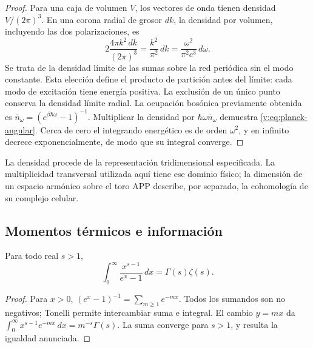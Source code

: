 \begin{proof}
Para una caja de volumen \(V\), los vectores de onda tienen densidad
\(V/(2\pi)^3\). En una corona radial de grosor \(dk\), la densidad
por volumen, incluyendo las dos polarizaciones, es
\[
 2\frac{4\pi k^2\,dk}{(2\pi)^3}=\frac{k^2}{\pi^2}\,dk
 =\frac{\omega^2}{\pi^2c^3}\,d\omega.
\]
Se trata de la densidad límite de las sumas sobre la red periódica
sin el modo constante. Esta elección define el producto de partición
antes del límite: cada modo de excitación tiene energía positiva.
La exclusión de un único punto conserva la densidad límite radial.
La ocupación bosónica previamente obtenida es
\(\bar n_\omega=(e^{\beta\hbar\omega}-1)^{-1}\).
Multiplicar la densidad por \(\hbar\omega\bar n_\omega\) demuestra
\eqref{v:eq:planck-angular}. Cerca de cero el integrando energético es
de orden \(\omega^2\), y en infinito decrece exponencialmente, de modo
que su integral converge.
\end{proof}

La densidad procede de la representación tridimensional especificada.
La multiplicidad transversal utilizada aquí tiene ese dominio físico;
la dimensión de un espacio armónico sobre el toro APP describe, por
separado, la cohomología de su complejo celular.



\subsection{Momentos térmicos e información}

\begin{lemma}
\label{v:lem:momento-bosonico}
Para todo real \(s>1\),
\begin{equation}
 \int_0^\infty\frac{x^{s-1}}{e^x-1}\,dx
 =\Gamma(s)\zeta(s).
 \label{v:eq:momento-bosonico}
\end{equation}
\end{lemma}
\begin{proof}
Para \(x>0\), \((e^x-1)^{-1}=\sum_{m\geq1}e^{-mx}\).
Todos los sumandos son no negativos; Tonelli permite intercambiar suma
e integral. El cambio \(y=mx\) da
\(\int_0^\infty x^{s-1}e^{-mx}\,dx=m^{-s}\Gamma(s)\).
La suma converge para \(s>1\), y resulta la igualdad anunciada.
\end{proof}

